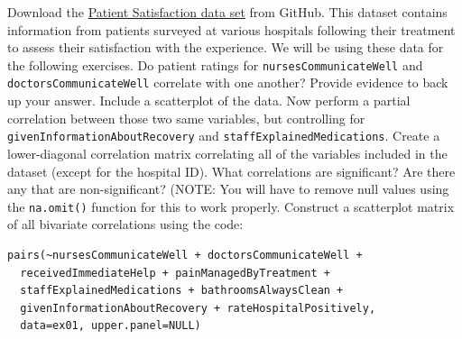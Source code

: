 \prob Download the \href{https://raw.githubusercontent.com/faulconbridge/appliedStats/master/LaTeX/part03/data/correlationEx01.csv}{Patient Satisfaction data set} from GitHub. This dataset contains information from patients surveyed at various hospitals following their treatment to assess their satisfaction with the experience. We will be using these data for the following exercises.
\prob Do patient ratings for \verb|nursesCommunicateWell| and \verb|doctorsCommunicateWell| correlate with one another? Provide evidence to back up your answer. Include a scatterplot of the data.
\prob Now perform a partial correlation between those two same variables, but controlling for\\\verb|givenInformationAboutRecovery| and \verb|staffExplainedMedications|.
\prob Create a lower-diagonal correlation matrix correlating all of the variables included in the dataset (except for the hospital ID). What correlations are significant? Are there any that are non-significant? (NOTE: You will have to remove null values using the \verb|na.omit()| function for this to work properly.
\prob Construct a scatterplot matrix of all bivariate correlations using the code:
\begin{framed}
\begin{Verbatim}[samepage=TRUE]
pairs(~nursesCommunicateWell + doctorsCommunicateWell +
  receivedImmediateHelp + painManagedByTreatment +
  staffExplainedMedications + bathroomsAlwaysClean +
  givenInformationAboutRecovery + rateHospitalPositively,
  data=ex01, upper.panel=NULL)
\end{Verbatim}
\end{framed}
  
